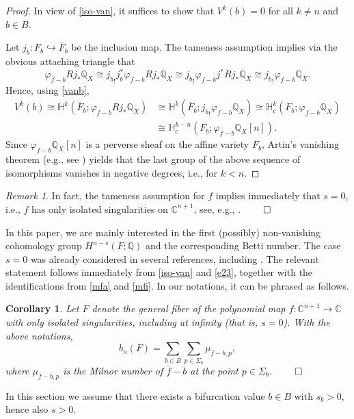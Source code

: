 \documentclass[12pt,leqno,twoside]{amsart}
\newtheorem{corollary}[theorem]{Corollary}
\theoremstyle{remark}
\newtheorem{remark}[theorem]{\sc Remark}
\theoremstyle{remark}
\theoremstyle{definition}
\theoremstyle{remark}
\theoremstyle{remark}
\theoremstyle{remark}
\numberwithin{equation}{section}  %
\def\be{\begin{equation}}
\def\ee{\end{equation}}
\def\bc{\begin{corollary}}
\def\ec{\end{corollary}}
\def\br{\begin{remark}}
\def\er{\end{remark}}
\newcommand{\bC}{\mathbb{C}}
\newcommand{\bH}{\mathbb{H}}
\newcommand{\bQ}{\mathbb{Q}}
\newcommand{\of}{\overline{f}}
\newcommand{\oF}{\overline{F}}
\begin{document}
\begin{proof}
In view of  \eqref{iso-van}, it suffices to show that $V^k(b)=0$ for all $k \neq n$ and $b \in B$. 

Let $j_b:F_b\hookrightarrow \oF_b$ be the inclusion map. The tameness assumption implies via the obvious attaching triangle that
\[
\varphi_{\overline{f}-b}Rj_*\bQ_X \cong {j_b}_! j_b^* \varphi_{\overline{f}-b}Rj_*\bQ_X \cong {j_b}_!  \varphi_{{f}-b}j^*Rj_*\bQ_X \cong {j_b}_!  \varphi_{{f}-b}\bQ_X.
\]
Hence, using \eqref{vanb},
\[ \begin{split}
V^k(b)\cong \bH^k(\overline{F}_b; \varphi_{\overline{f}-b}Rj_*\bQ_X) & \cong
\bH^k(\overline{F}_b; {j_b}_!  \varphi_{{f}-b}\bQ_X) \cong \bH_c^k(F_b;   \varphi_{{f}-b}\bQ_X)\\ & \cong \bH_c^{k-n}(F_b;   \varphi_{{f}-b}\bQ_X[n]).
\end{split}
\]
Since $ \varphi_{{f}-b}\bQ_X[n]$ is a perverse sheaf on the affine variety $F_b$, Artin's vanishing theorem (e.g., see \cite[Thm.10.3.59]{MS}) yields that the last group of the above sequence of isomorphisms vanishes in negative degrees, i.e., for $k<n$.
\end{proof}

\br\label{rem33}
In fact, the tameness assumption for $f$ implies immediately that $s=0$, i.e.,  $f$ has only isolated singularities on $\bC^{n+1}$, see, e.g., \cite[Thm.6.3.17]{Di}. $\hfill\qed$
\er

In this paper, we are mainly interested in the first (possibly) non-vanishing cohomology group $H^{n-s}(F;\bQ)$ and the corresponding Betti number. The case $s=0$ was already considered in several references, including \cite{ST,Hamm,Di}. The relevant statement follows immediately from \eqref{iso-van} and \eqref{e23}, together with the identifications from \eqref{mfa} and \eqref{mfi}. In our notations, it can be phrased as follows.

\bc\label{geniso}
Let $F$ denote the general fiber of the polynomial map $f:\bC^{n+1}\to \bC$ with only isolated singularities, including at infinity (that is, $s=0$). With the above notations, 
\be\label{genisob}
b_n(F)=\sum_{b \in B} \sum_{p\in \Sigma_b} \mu_{\of-b,p},
\ee
where $\mu_{\of-b,p}$ is the Milnor number of $\of-b$ at the point $p \in \Sigma_b$. $\hfill\qed$
\ec



In this section we assume that there exists a bifurcation value $b \in B$ with $s_b>0$, hence also $s>0$.
\end{document}
